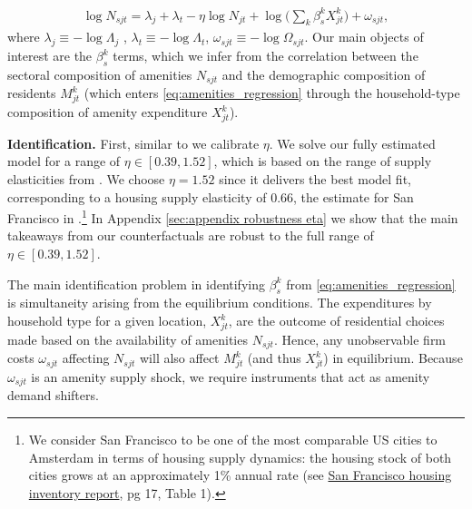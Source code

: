 \documentclass[11pt]{article}
\newcommand{\Paragraph}{\vspace{0.1cm}\noindent\textbf}
\begin{document}
\begin{align}\label{eq:amenities_regression}
\log N_{sjt} = \lambda_j + \lambda_t - \eta \log N_{jt}+\log \Big( \sum_k \beta_{s}^k X_{jt}^k \Big) + \omega_{sjt},
\end{align}
where $\lambda_j \equiv - \log \Lambda_j$ , $\lambda_t \equiv - \log \Lambda_t$, $\omega_{sjt} \equiv - \log \Omega_{sjt}$. Our main objects of interest are the $\beta_s^k$ terms, which we infer from the correlation between the sectoral composition of amenities $N_{sjt}$ and the demographic composition of residents $M_{jt}^k$ (which enters \ref{eq:amenities_regression} through the household-type composition of amenity expenditure $X_{jt}^k$).


\Paragraph{Identification.} First, similar to \cite{couture2021income} we calibrate $\eta$. We solve our fully estimated model for a range of $\eta \in [0.39, 1.52]$, which is based on the range of supply elasticities from \cite{saiz2010geographic}. We choose $\eta = 1.52$ since it delivers the best model fit, corresponding to a housing supply elasticity of 0.66, the estimate for San Francisco in \cite{saiz2010geographic}.\footnote{We consider San Francisco to be one of the most comparable US cities to Amsterdam in terms of housing supply dynamics: the housing stock of both cities grows at an approximately 1\% annual rate (see \href{https://sfplanning.org/sites/default/files/documents/reports/2021_Housing_Inventory.pdf}{San Francisco housing inventory report}, pg 17, Table 1).} In Appendix \ref{sec:appendix robustness eta} we show that the main takeaways from our counterfactuals are robust to the full range of $\eta \in [0.39, 1.52]$.

The main identification problem in identifying $\beta^k_s$ from \ref{eq:amenities_regression} is simultaneity arising from the equilibrium conditions. The expenditures by household type for a given location, $X_{jt}^k$, are the outcome of residential choices made based on the availability of amenities $N_{sjt}$. Hence, any unobservable firm costs $\omega_{sjt}$ affecting $N_{sjt}$ will also affect $M_{jt}^k$ (and thus $X_{jt}^k$) in equilibrium. Because $\omega_{sjt}$ is an amenity supply shock, we require instruments that act as amenity demand shifters. 
\end{document}
